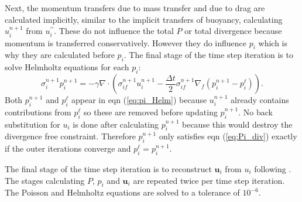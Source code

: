\documentclass[draft]{agujournal2019}
\begin{document}
Next, the momentum transfers due to mass transfer and due to drag
are calculated implicitly, similar to the implicit transfers of buoyancy,
calculating $u_{i}^{n+1}$ from $u_{i}^{\prime\prime}$. These do
not influence the total $P$ or total divergence because momentum
is transferred conservatively. However they do influence $p_{i}$
which is why they are calculated before $p_{i}$. The final stage
of the time step iteration is to solve Helmholtz equations for each
$p_{i}$:
\begin{equation}
\sigma_{i}^{n+1}p_{i}^{n+1}=-\gamma\nabla\cdot\left(\sigma_{if}^{n+1}u_{i}^{n+1}-\frac{\Delta t}{2}\sigma_{if}^{n+1}\nabla_{f}\left(p_{i}^{n+1}-p_{i}^{\ell}\right)\right).\label{eq:pi_Helm}
\end{equation}
Both $p_{i}^{n+1}$ and $p_{i}^{\ell}$ appear in eqn (\ref{eq:pi_Helm})
because $u_{i}^{n+1}$ already contains contributions from $p_{i}^{\ell}$
so these are removed before updating $p_{i}^{n+1}$. No back substitution
for $u_{i}$ is done after calculating $p_{i}^{n+1}$ because this
would destroy the divergence free constraint. Therefore $p_{i}^{n+1}$
only satisfies eqn (\ref{eq:Pi_div}) exactly if the outer iterations
converge and $p_{i}^{\ell}=p_{i}^{n+1}$. 

The final stage of the time step iteration is to reconstruct $\mathbf{u}_{i}$
from $u_{i}$ following . The stages calculating $P$,
$p_{i}$ and $\mathbf{u}_{i}$ are repeated twice per time step iteration.
The Poisson and Helmholtz equations are solved to a tolerance of $10^{-6}$.

\subsection{ \label{sec:cAveraging}}

\end{document}

